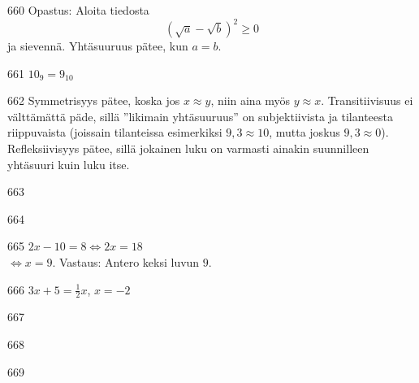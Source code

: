 \begin{Vastaus}{660}
     Opastus: Aloita tiedosta \[\left(\sqrt{a}-\sqrt{b}\right)^2 \geq 0\] ja sievennä. Yhtäsuuruus pätee, kun $a = b$.
    
\end{Vastaus}
\begin{Vastaus}{661}
	$10_9=9_{10}$
	
\end{Vastaus}
\begin{Vastaus}{662}
Symmetrisyys pätee, koska jos $x\approx y$, niin aina myös $y\approx x$. Transitiivisuus ei välttämättä päde, sillä ''likimain yhtäsuuruus'' on subjektiivista ja tilanteesta riippuvaista (joissain tilanteissa esimerkiksi $9,3\approx 10$, mutta joskus $9,3 \approx 0$). Refleksiivisyys pätee, sillä jokainen luku on varmasti ainakin suunnilleen yhtäsuuri kuin luku itse.
	
\end{Vastaus}
\begin{Vastaus}{663}
    
\end{Vastaus}
\begin{Vastaus}{664}
    
\end{Vastaus}
\begin{Vastaus}{665}
        $2x-10=8 \Leftrightarrow 2x=18$ \\ $\Leftrightarrow x=9$. Vastaus: Antero keksi luvun $9$.
    
\end{Vastaus}
\begin{Vastaus}{666}
        $3x+5=\frac12x$, $x=-2$
    
\end{Vastaus}
\begin{Vastaus}{667}
    
\end{Vastaus}
\begin{Vastaus}{668}
    
\end{Vastaus}
\begin{Vastaus}{669}
    
\end{Vastaus}
